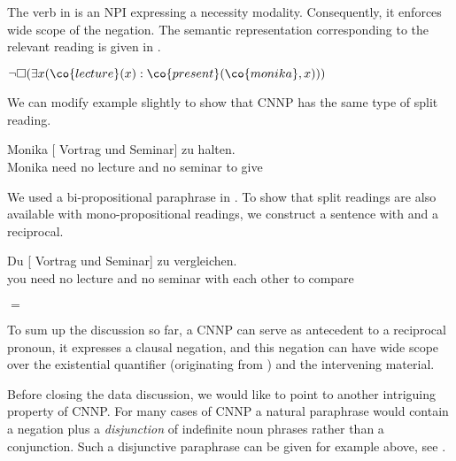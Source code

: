 \documentclass[output=paper]{langsci/langscibook}
\begin{document}
The verb  in  is an NPI expressing a necessity modality. Consequently, it enforces wide scope of the negation. The semantic representation corresponding to the relevant reading is given in .

\ea \label{ex-tie-lf}
$\lnot \Box (\exists x (\co{lecture}(x) : \co{present}(\co{monika},x)))$
\z 

We can modify example  slightly to show that CNNP has the same type of split reading.


\ea \label{ex-tie-conj}
\gll Monika  [ Vortrag und  Seminar] zu halten.\\
Monika need \hphantom{[}no lecture and no seminar to give\\
\glt 
{}
\z 

We used a bi-propositional paraphrase in . 
To show that split readings are also available with mono-propositional readings, we construct a sentence with  and a reciprocal.

\ea
\gll Du  [ Vortrag und  Seminar]  zu vergleichen.\\
you need \hphantom{[}no lecture and no seminar {with each other} to compare\\
\glt {}\\
$=$ 
\z 

To sum up the discussion so far, a CNNP can serve as antecedent to a reciprocal pronoun, it expresses a clausal negation, and this negation can have wide scope over the existential quantifier
(originating from ) and the intervening material.

\bigskip%
Before closing the data discussion, we would like to point to another intriguing property of CNNP. 
For many cases of CNNP a natural paraphrase would contain a negation plus a \emph{disjunction} of indefinite noun phrases rather than a conjunction. Such a disjunctive paraphrase can be given for example  above, see .
\end{document}
